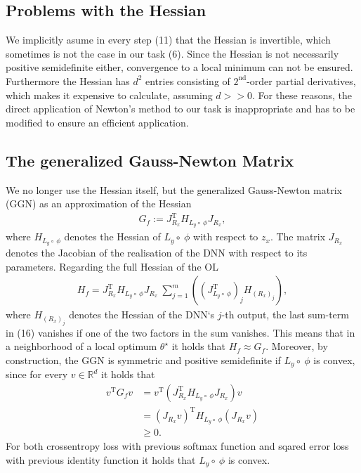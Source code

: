 \documentclass[conference]{IEEEtran}
\begin{document}
	\subsection{Problems with the Hessian}
	\noindent
	We implicitly asume in every step (11) that the Hessian is invertible, which sometimes is not the case in our task (6). Since the Hessian is not necessarily positive semidefinite either, convergence to a local minimum can not be ensured. Furthermore the Hessian has $d^{2}$ entries consisting of $2^{\text{nd}}$-order partial derivatives, which makes it expensive to calculate, assuming $d>>0$. For these reasons, the direct application of Newton's method to our task is inappropriate and has to be modified to ensure an efficient application.

	\subsection{The generalized Gauss-Newton Matrix}
	\noindent
	We no longer use the Hessian itself, but the generalized Gauss-Newton matrix (GGN) as an approximation of the Hessian
	\begin{align}
	G_{f} := J_{R_{x}}^{\mathrm{T}}H_{L_{y}\circ\:\phi}J_{R_{x}},
	\end{align}
	where $H_{L_{y}\circ\:\phi}$ denotes the Hessian of $L_{y}\circ\:\phi$ with respect to $z_{x}$. The matrix $J_{R_{x}}$ denotes the Jacobian of the realisation of the DNN with respect to its parameters.
	Regarding the full Hessian of the OL
	\begin{align}
	H_{f} = J_{R_{x}}^{\mathrm{T}}H_{L_{y}\circ\:\phi}J_{R_{x}}\:\sum_{j = 1}^{m}\left(\left(J_{L_{y}\circ \:\phi}^{\mathrm{T}}\right)_{j} H_{(R_{x})_{j}}\right),
	\end{align}
	where $H_{(R_{x})_{j}}$ denotes the Hessian of the DNN`s  $j$-th output, the last sum-term in (16) vanishes if one of the two factors in the sum vanishes.
	This means that in a neighborhood of a local optimum $\theta^{\star}$ it holds that $H_{f} \approx G_{f}$.   Moreover, by construction, the GGN is symmetric and positive semidefinite if $L_{y}\circ\:\phi$ is convex, since for every $v\in\mathbb{R}^{d}$ it holds that
	\begin{align}
	v^{\mathrm{T}}G_{f}v &= v^{\mathrm{T}}\left( J_{R_{x}}^{\mathrm{T}}H_{L_{y}\circ\:\phi}J_{R_{x}}\right)v\\
	&= \left(J_{R_{x}}v\right)^{\mathrm{T}}H_{L_{y}\circ\:\phi}\left(J_{R_{x}}v\right) \\
	&\geq 0.
	\end{align}
	For both crossentropy loss with previous softmax function and sqared error loss with previous identity function it holds that $L_{y}\circ\:\phi$ is convex.
\end{document}

